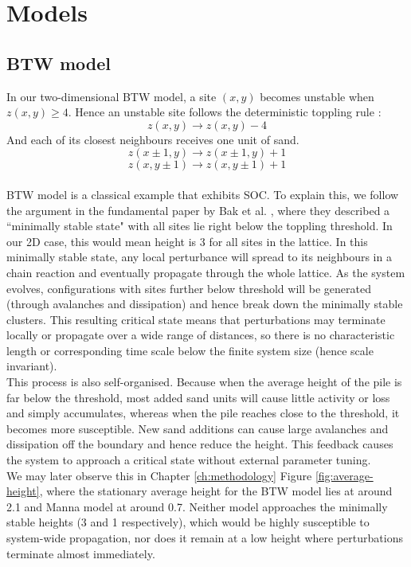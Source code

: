 \chapter{Models}\label{ch:background}

\section{BTW model}\label{sec:btw}

In our two-dimensional BTW model, a site $(x,y)$ becomes unstable when $z(x, y)\geq 4$. Hence an unstable site follows the deterministic toppling rule \cite{BTW1988}:
\[
z(x,y) \rightarrow z(x,y)-4
\]
And each of its closest neighbours receives one unit of sand.
\[
z(x\pm1,y) \rightarrow z(x\pm1,y)+1
\]
\[
z(x,y\pm1) \rightarrow z(x,y\pm1)+1
\]
\\
BTW model is a classical example that exhibits SOC. To explain this, we follow the argument in the fundamental paper by Bak et al. \cite{BTW1988}, where they described a ``minimally stable state" with all sites lie right below the toppling threshold. In our 2D case, this would mean height is 3 for all sites in the lattice. In this minimally stable state, any local perturbance will spread to its neighbours in a chain reaction and eventually propagate through the whole lattice. As the system evolves, configurations with sites further below threshold will be generated (through avalanches and dissipation) and hence break down the minimally stable clusters. This resulting critical state means that perturbations may terminate locally or propagate over a wide range of distances, so there is no characteristic length or corresponding time scale below the finite system size (hence scale invariant). \\

This process is also self-organised. Because when the average height of the pile is far below the threshold, most added sand units will cause little activity or loss and simply accumulates, whereas when the pile reaches close to the threshold, it becomes more susceptible. New sand additions can cause large avalanches and dissipation off the boundary and hence reduce the height. This feedback causes the system to approach a critical state without external parameter tuning. \\

We may later observe this in Chapter \ref{ch:methodology} Figure \ref{fig:average-height}, where the stationary average height for the BTW model lies at around 2.1 and Manna model at around 0.7. Neither model approaches the minimally stable heights (3 and 1 respectively), which would be highly susceptible to system-wide propagation, nor does it remain at a low height where perturbations terminate almost immediately. \\

